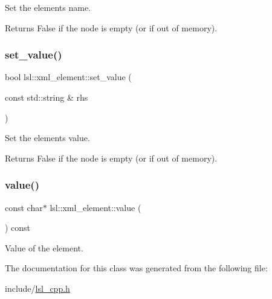Set the element\textquotesingle{}s name. \begin{DoxyReturn}{Returns}
False if the node is empty (or if out of memory). 
\end{DoxyReturn}
\mbox{\label{classlsl_1_1xml__element_a3a3bbf2468ba3abd9309764faa61a7a4}} 
\subsubsection{\texorpdfstring{set\+\_\+value()}{set\_value()}}
{\footnotesize\ttfamily bool lsl\+::xml\+\_\+element\+::set\+\_\+value (\begin{DoxyParamCaption}\item[{const std\+::string \&}]{rhs }\end{DoxyParamCaption})\hspace{0.3cm}{\ttfamily [inline]}}

Set the element\textquotesingle{}s value. \begin{DoxyReturn}{Returns}
False if the node is empty (or if out of memory). 
\end{DoxyReturn}
\mbox{\label{classlsl_1_1xml__element_a1a5e666b35c5d7262e4ffbda86b57f73}} 
\subsubsection{\texorpdfstring{value()}{value()}}
{\footnotesize\ttfamily const char$\ast$ lsl\+::xml\+\_\+element\+::value (\begin{DoxyParamCaption}{ }\end{DoxyParamCaption}) const\hspace{0.3cm}{\ttfamily [inline]}}



Value of the element. 



The documentation for this class was generated from the following file\+:\begin{DoxyCompactItemize}
\item 
include/\hyperlink{lsl__cpp_8h}{lsl\+\_\+cpp.\+h}\end{DoxyCompactItemize}
